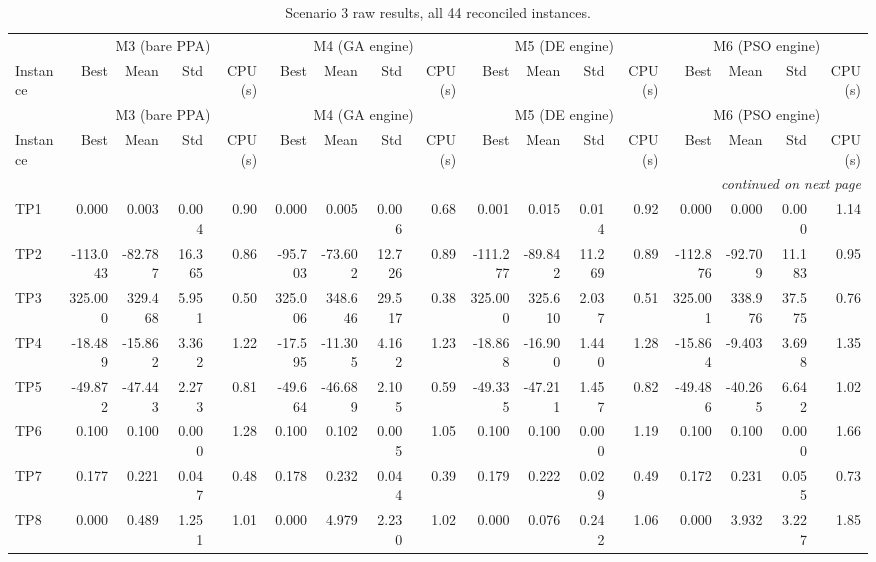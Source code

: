 \begingroup\scriptsize
\begin{longtable}{lrrrrrrrrrrrrrrrr}
\caption{Scenario 3 raw results, all 44 reconciled instances.}\label{tab:scenario3}\\
\toprule
 & \multicolumn{4}{c}{M3 (bare PPA)} & \multicolumn{4}{c}{M4 (GA engine)} & \multicolumn{4}{c}{M5 (DE engine)} & \multicolumn{4}{c}{M6 (PSO engine)} \\
\cmidrule(lr){2-5} \cmidrule(lr){6-9} \cmidrule(lr){10-13} \cmidrule(lr){14-17}
Instance & Best & Mean & Std & CPU (s) & Best & Mean & Std & CPU (s) & Best & Mean & Std & CPU (s) & Best & Mean & Std & CPU (s) \\
\midrule
\endfirsthead
\toprule
 & \multicolumn{4}{c}{M3 (bare PPA)} & \multicolumn{4}{c}{M4 (GA engine)} & \multicolumn{4}{c}{M5 (DE engine)} & \multicolumn{4}{c}{M6 (PSO engine)} \\
\cmidrule(lr){2-5} \cmidrule(lr){6-9} \cmidrule(lr){10-13} \cmidrule(lr){14-17}
Instance & Best & Mean & Std & CPU (s) & Best & Mean & Std & CPU (s) & Best & Mean & Std & CPU (s) & Best & Mean & Std & CPU (s) \\
\midrule
\endhead
\midrule\multicolumn{17}{r}{\emph{continued on next page}}\\\midrule
\endfoot
\bottomrule
\endlastfoot
TP1 & 0.000 & 0.003 & 0.004 & 0.90 & 0.000 & 0.005 & 0.006 & 0.68 & 0.001 & 0.015 & 0.014 & 0.92 & 0.000 & 0.000 & 0.000 & 1.14 \\
TP2 & -113.043 & -82.787 & 16.365 & 0.86 & -95.703 & -73.602 & 12.726 & 0.89 & -111.277 & -89.842 & 11.269 & 0.89 & -112.876 & -92.709 & 11.183 & 0.95 \\
TP3 & 325.000 & 329.468 & 5.951 & 0.50 & 325.006 & 348.646 & 29.517 & 0.38 & 325.000 & 325.610 & 2.037 & 0.51 & 325.001 & 338.976 & 37.575 & 0.76 \\
TP4 & -18.489 & -15.862 & 3.362 & 1.22 & -17.595 & -11.305 & 4.162 & 1.23 & -18.868 & -16.900 & 1.440 & 1.28 & -15.864 & -9.403 & 3.698 & 1.35 \\
TP5 & -49.872 & -47.443 & 2.273 & 0.81 & -49.664 & -46.689 & 2.105 & 0.59 & -49.335 & -47.211 & 1.457 & 0.82 & -49.486 & -40.265 & 6.642 & 1.02 \\
TP6 & 0.100 & 0.100 & 0.000 & 1.28 & 0.100 & 0.102 & 0.005 & 1.05 & 0.100 & 0.100 & 0.000 & 1.19 & 0.100 & 0.100 & 0.000 & 1.66 \\
TP7 & 0.177 & 0.221 & 0.047 & 0.48 & 0.178 & 0.232 & 0.044 & 0.39 & 0.179 & 0.222 & 0.029 & 0.49 & 0.172 & 0.231 & 0.055 & 0.73 \\
TP8 & 0.000 & 0.489 & 1.251 & 1.01 & 0.000 & 4.979 & 2.230 & 1.02 & 0.000 & 0.076 & 0.242 & 1.06 & 0.000 & 3.932 & 3.227 & 1.85 \\

\end{longtable}
